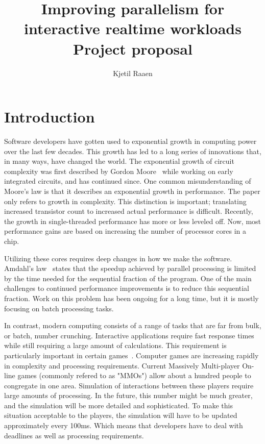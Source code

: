 \documentclass{article}
\title{Improving parallelism for interactive realtime workloads\\ \vspace{1ex} Project proposal}
\author{Kjetil Raaen}
\begin{document}
\maketitle

\section{Introduction}
\label{intro}
Software developers have gotten used to exponential growth in computing power over the last few decades. This growth has led to a long series of innovations that, in
many ways, have changed the world. The exponential growth of circuit
complexity was first described by Gordon Moore~\cite{moore} while
working on early integrated circuits, and has continued since. One
common misunderstanding of Moore's law is that it describes an
exponential growth in performance. The paper only refers to growth in
complexity. This distinction is important; translating increased
transistor count to increased actual performance is
difficult. Recently, the growth in single-threaded performance has
more or less leveled off. Now, most performance gains
are based on increasing the number of processor cores in a chip\cite{dally}.

Utilizing these cores requires deep changes in how we make the
software. Amdahl's law~\cite{amdahl} states that the speedup achieved
by parallel processing is limited by the time needed for the
sequential fraction of the program. One of the main challenges to continued performance improvements is to reduce
this sequential fraction. Work on this problem has been ongoing for a
long time, but it is mostly focusing on batch processing tasks.

In contrast, modern computing consists of a range of tasks that are far
from bulk, or batch, number crunching. Interactive applications
require fast response times while still requiring a large amount of
calculations. This requirement is particularly important in
certain games~\cite{claypool++-2006}. Computer games are increasing rapidly in complexity and
processing requirements. Current Massively Multi-player On-line games (commonly refered to as "MMOs")
allow about a hundred people to congregate in one area. Simulation of
interactions between these players require large amounts of
processing. In the future, this number might be much greater, and the
simulation will be more detailed and sophisticated. To make this
situation acceptable to the players, the simulation will have to be
updated approximately every 100ms. Which means that developers have to
deal with deadlines as well as processing requirements.
\end{document}
